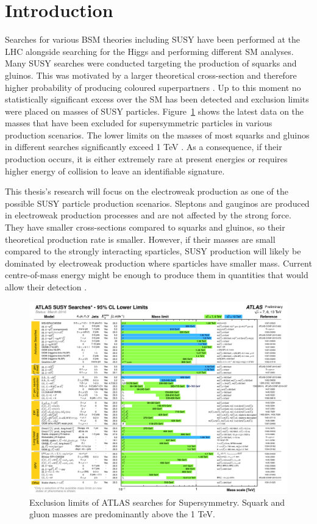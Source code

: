 \section{Introduction}

Searches for various BSM theories including SUSY have been performed at the LHC  alongside searching for the Higgs and performing different SM analyses. Many SUSY searches were conducted targeting the production of squarks and gluinos. This was motivated by a larger theoretical cross-section and therefore higher probability of producing coloured superpartners \cite{borschensky2014squark}. Up to this moment no statistically significant excess over the SM has been detected and exclusion limits were placed on masses of SUSY particles. Figure~\ref{fig:SUSYlimit} shows the latest data on the masses that have been excluded for supersymmetric particles in various production scenarios. The lower limits on the masses of most squarks and gluinos in different searches significantly exceed 1 TeV \citep{aad2015summary}. As a consequence, if their production occurs, it is either extremely rare at present energies or requires higher energy of collision to leave an identifiable signature. 

This thesis's research will focus on the electroweak production as one of the possible SUSY particle production scenarios. Sleptons and gauginos are produced in electroweak production processes and are not affected by the strong force. They have smaller cross-sections compared to squarks and gluinos, so their theoretical production rate is smaller. However, if their masses are small compared to the strongly interacting sparticles, SUSY production will likely be dominated by electroweak production where sparticles have smaller mass. Current centre-of-mass energy might be enough to produce them in quantities that would allow their detection \citep{atlas2015search}. 
\begin{figure}
\includegraphics[width=\textwidth]{Chap3/ATLAS_SUSY_Summary.png}
\caption[Exclusion limits of ATLAS searches for Supersymmetry]{Exclusion limits of ATLAS searches for Supersymmetry. Squark and gluon masses are predominantly above the 1 TeV. \citep{SUSYlimits}}
\label{fig:SUSYlimit}
\end{figure}
\cleardoublepage



